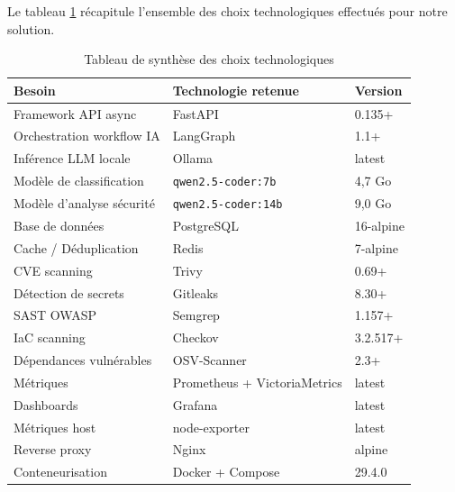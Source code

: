         Le tableau \ref{tab:tech_synthesis} récapitule l'ensemble des choix technologiques
        effectués pour notre solution.

        \begin{table}[H]
        \centering
        \begin{tabular}{|m{5cm}|m{4cm}|m{3.5cm}|}
        \hline
        \textbf{Besoin} & \textbf{Technologie retenue} & \textbf{Version} \\
        \hline
        Framework API async & FastAPI & 0.135+ \\
        \hline
        Orchestration workflow IA & LangGraph & 1.1+ \\
        \hline
        Inférence LLM locale & Ollama & latest \\
        \hline
        Modèle de classification & \texttt{qwen2.\allowbreak{}5-coder:7b} & 4,7 Go \\
        \hline
        Modèle d'analyse sécurité & \texttt{qwen2.\allowbreak{}5-coder:14b} & 9,0 Go \\
        \hline
        Base de données & PostgreSQL & 16-alpine \\
        \hline
        Cache / Déduplication & Redis & 7-alpine \\
        \hline
        CVE scanning & Trivy & 0.69+ \\
        \hline
        Détection de secrets & Gitleaks & 8.30+ \\
        \hline
        SAST OWASP & Semgrep & 1.157+ \\
        \hline
        IaC scanning & Checkov & 3.2.517+ \\
        \hline
        Dépendances vulnérables & OSV-Scanner & 2.3+ \\
        \hline
        Métriques & Prometheus + VictoriaMetrics & latest \\
        \hline
        Dashboards & Grafana & latest \\
        \hline
        Métriques host & node-exporter & latest \\
        \hline
        Reverse proxy & Nginx & alpine \\
        \hline
        Conteneurisation & Docker + Compose & 29.4.0 \\
        \hline
        \end{tabular}
        \caption{Tableau de synthèse des choix technologiques}
        \label{tab:tech_synthesis}
        \end{table}

